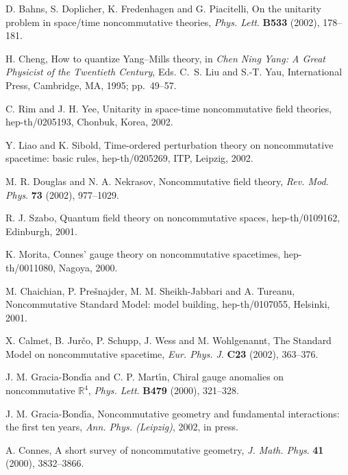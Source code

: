 \documentclass[a4paper,12pt]{article}
\newcommand{\R}{\mathbb{R}}         %
\newcommand{\1}{\mathbf{1}}         %
\newcommand{\7}{\dagger}            %
\newcommand{\8}{\bullet}            %
\renewcommand{\.}{\cdot}            %
\renewcommand{\:}{\colon}           %
\begin{document}
\begin{thebibliography}{74}
D. Bahns, S. Doplicher, K. Fredenhagen and G. Piacitelli,
On the unitarity problem in space/time noncommutative theories,
\textit{Phys. Lett}. {\bf B533} (2002), 178--181.

H. Cheng,
How to quantize Yang--Mills theory,
in \textit{Chen Ning Yang: A Great Physicist of the Twentieth Century},
Eds. C.~S. Liu and S.-T. Yau, International Press, Cambridge, MA, 1995;
pp.~49--57.

C. Rim and J. H. Yee,
Unitarity in space-time noncommutative field theories,
hep-th/0205193, Chonbuk, Korea, 2002.

Y. Liao and K. Sibold,
Time-ordered perturbation theory on noncommutative spacetime:
basic rules,
hep-th/0205269, ITP, Leipzig, 2002.

M. R. Douglas and N. A. Nekrasov,
Noncommutative field theory,
\textit{Rev. Mod. Phys}. {\bf 73} (2002), 977--1029.

R. J. Szabo,
Quantum field theory on noncommutative spaces,
hep-th/0109162, Edinburgh, 2001.

K. Morita,
Connes' gauge theory on noncommutative spacetimes,
hep-th/0011080, Nagoya, 2000.

M. Chaichian, P. Pre\v{s}najder, M. M. Sheikh-Jabbari and A. Tureanu,
Noncommutative Standard Model: model building,
hep-th/0107055, Helsinki, 2001.

X. Calmet, B. Jur\v{c}o, P. Schupp, J. Wess and M. Wohlgenannt,
The Standard Model on noncommutative spacetime,
\textit{Eur. Phys. J}. {\bf C23} (2002), 363--376.

J. M. Gracia-Bond\'{\i}a and C. P. Mart\'{\i}n,
Chiral gauge anomalies on noncommutative $\R^4$,
\textit{Phys. Lett}. {\bf B479} (2000), 321--328.

J. M. Gracia-Bond\'{\i}a,
Noncommutative geometry and fundamental interactions: the first
ten years,
\textit{Ann. Phys. (Leipzig)}, 2002, in press.

A. Connes,
A short survey of noncommutative geometry,
\textit{J. Math. Phys}. {\bf 41} (2000), 3832--3866.


\end{thebibliography}
\end{document}
